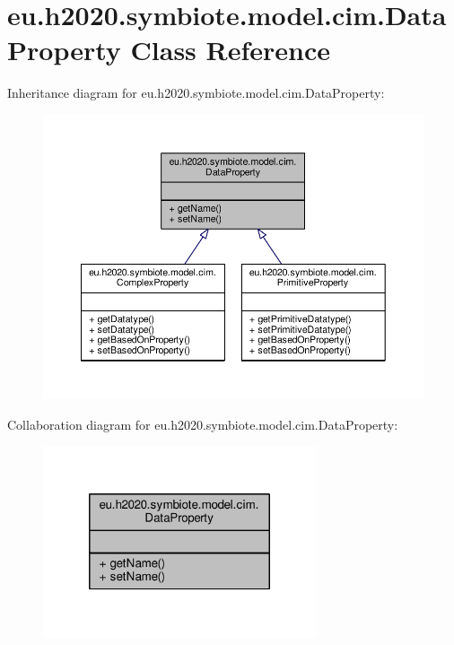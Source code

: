 \hypertarget{classeu_1_1h2020_1_1symbiote_1_1model_1_1cim_1_1DataProperty}{}\section{eu.\+h2020.\+symbiote.\+model.\+cim.\+Data\+Property Class Reference}
\label{classeu_1_1h2020_1_1symbiote_1_1model_1_1cim_1_1DataProperty}


Inheritance diagram for eu.\+h2020.\+symbiote.\+model.\+cim.\+Data\+Property\+:
\nopagebreak
\begin{figure}[H]
\begin{center}
\leavevmode
\includegraphics[width=350pt]{classeu_1_1h2020_1_1symbiote_1_1model_1_1cim_1_1DataProperty__inherit__graph}
\end{center}
\end{figure}


Collaboration diagram for eu.\+h2020.\+symbiote.\+model.\+cim.\+Data\+Property\+:
\nopagebreak
\begin{figure}[H]
\begin{center}
\leavevmode
\includegraphics[width=228pt]{classeu_1_1h2020_1_1symbiote_1_1model_1_1cim_1_1DataProperty__coll__graph}
\end{center}
\end{figure}
